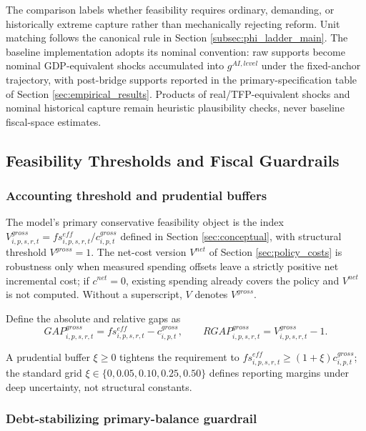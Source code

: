 \documentclass[11pt,a4paper]{article}
\begin{document}
The comparison labels whether feasibility requires ordinary, demanding, or historically extreme capture rather than mechanically rejecting reform. Unit matching follows the canonical rule in Section \ref{subsec:phi_ladder_main}. The baseline implementation adopts its nominal convention: raw supports become nominal GDP-equivalent shocks accumulated into $g^{AI,level}$ under the fixed-anchor trajectory, with post-bridge supports reported in the primary-specification table of Section \ref{sec:empirical_results}. Products of real/TFP-equivalent shocks and nominal historical capture remain heuristic plausibility checks, never baseline fiscal-space estimates.


\subsection{Feasibility Thresholds and Fiscal Guardrails}\label{sec:thresholds}

\subsubsection{Accounting threshold and prudential buffers}

The model's primary conservative feasibility object is the index $V^{gross}_{i,p,s,r,t}=fs^{eff}_{i,p,s,r,t}/c^{gross}_{i,p,t}$ defined in Section \ref{sec:conceptual}, with structural threshold $V^{gross}=1$. The net-cost version $V^{net}$ of Section \ref{sec:policy_costs} is robustness only when measured spending offsets leave a strictly positive net incremental cost; if $c^{net}=0$, existing spending already covers the policy and $V^{net}$ is not computed. Without a superscript, $V$ denotes $V^{gross}$.

Define the absolute and relative gaps as
\begin{equation}
    GAP^{gross}_{i,p,s,r,t}=fs^{eff}_{i,p,s,r,t}-c^{gross}_{i,p,t},
    \qquad
    RGAP^{gross}_{i,p,s,r,t}=V^{gross}_{i,p,s,r,t}-1.
\end{equation}

A prudential buffer $\xi\geq0$ tightens the requirement to $fs^{eff}_{i,p,s,r,t}\geq(1+\xi)c^{gross}_{i,p,t}$; the standard grid $\xi\in\{0,0.05,0.10,0.25,0.50\}$ defines reporting margins under deep uncertainty, not structural constants.

\subsubsection{Debt-stabilizing primary-balance guardrail}
\end{document}
